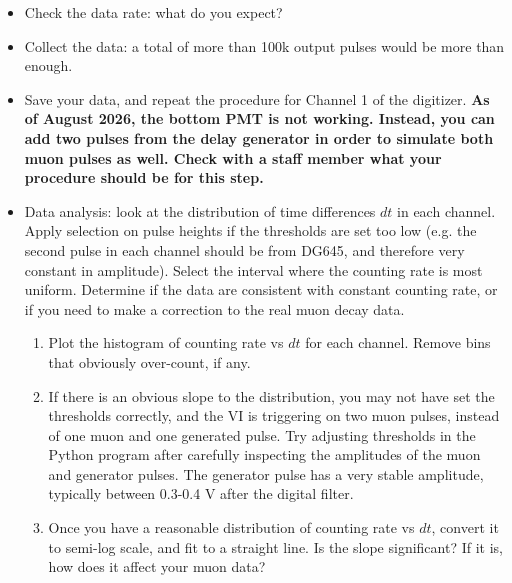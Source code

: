 \documentclass{../lab}
\begin{document}
\begin{enumerate}
\begin{itemize}
        Note: you may also try the opposite way, i.e. triggering on the pulse generator and looking at the muons in relation to that. 

        \item Check the data rate: what do you expect?

        \item Collect the data: a total of more than 100k output pulses would be more than enough.

        \item Save your data, and repeat the procedure for Channel 1 of the digitizer. \textbf{As of August 2026, the bottom PMT is not working. Instead, you can add two pulses from the delay generator in order to simulate both muon pulses as well. Check with a staff member what your procedure should be for this step.}

        \item Data analysis: look at the distribution of time differences $dt$ in each channel. Apply selection on pulse heights if the thresholds are set too low (e.g. the second pulse in each channel should be from DG645, and therefore very constant in amplitude). Select the interval where the counting rate is most uniform. Determine if the data are consistent with constant counting rate, or if you need to make a correction to the real muon decay data.
        \begin{enumerate}
            \item Plot the histogram of counting rate vs $dt$ for each channel. Remove bins that obviously over-count, if any.
    
            \item If there is an obvious slope to the distribution, you may not have set the thresholds correctly, and the VI is triggering on two muon pulses, instead of one muon and one generated pulse. Try adjusting thresholds in the Python program after carefully inspecting the amplitudes of the muon and generator pulses. The generator pulse has a very stable amplitude, typically between 0.3-0.4 V after the digital filter.
    
            \item Once you have a reasonable distribution of counting rate vs $dt$, convert it to semi-log scale, and fit to a straight line. Is the slope significant? If it is, how does it affect your muon data?
        \end{enumerate}

    \end{itemize}


\end{enumerate}
\end{document}
